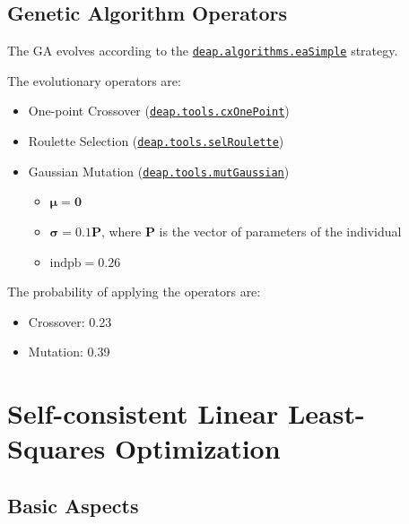 \documentclass[10pt,a4paper,openany]{memoir}
\numberwithin{equation}{section}
\begin{document}



\subsection{Genetic Algorithm Operators}
\label{sec:ga-evolutionary-operators}

The GA evolves according to the \href{https://deap.readthedocs.io/en/master/api/algo.html#deap.algorithms.eaSimple}{\texttt{deap.algorithms.eaSimple}} strategy.

The evolutionary operators are:
\begin{itemize}
  \item One-point Crossover (\href{https://deap.readthedocs.io/en/master/api/tools.html#deap.tools.cxOnePoint}{\texttt{deap.tools.cxOnePoint}})
  \item Roulette Selection (\href{https://deap.readthedocs.io/en/master/api/tools.html#deap.tools.selRoulette}{\texttt{deap.tools.selRoulette}})
  \item Gaussian Mutation (\href{https://deap.readthedocs.io/en/master/api/tools.html#deap.tools.mutGaussian}{\texttt{deap.tools.mutGaussian}})
    \begin{itemize}
    \item $\boldsymbol{\mu} = \boldsymbol{0}$
    \item $\boldsymbol{\sigma} = 0.1\mathbf{P}$, where $\mathbf{P}$ is the vector of parameters of the individual
      \item $\text{indpb} = 0.26$
    \end{itemize}
\end{itemize}
The probability of applying the operators are:
\begin{itemize}
\item Crossover: 0.23
\item Mutation: 0.39
\end{itemize}

\section{Self-consistent Linear Least-Squares Optimization}

\subsection{Basic Aspects}
\end{document}
